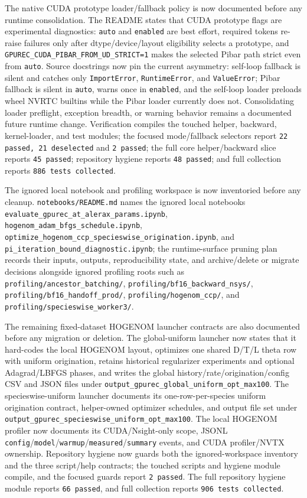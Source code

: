 \documentclass[11pt]{article}
\begin{document}
The native CUDA prototype loader/fallback policy is now documented before any
runtime consolidation.  The README states that CUDA prototype flags are
experimental diagnostics: \texttt{auto} and \texttt{enabled} are best effort,
required tokens re-raise failures only after dtype/device/layout eligibility
selects a prototype, and \texttt{GPUREC\_CUDA\_PIBAR\_FROM\_UD\_STRICT=1}
makes the selected Pibar path strict even from \texttt{auto}.  Source docstrings
now pin the current asymmetry: self-loop fallback is silent and catches only
\texttt{ImportError}, \texttt{RuntimeError}, and \texttt{ValueError};
Pibar fallback is silent in \texttt{auto}, warns once in \texttt{enabled}, and
the self-loop loader preloads wheel NVRTC builtins while the Pibar loader
currently does not.  Consolidating loader preflight, exception breadth, or
warning behavior remains a documented future runtime change.  Verification
compiles the touched helper, backward, kernel-loader, and test modules; the
focused mode/fallback selectors report \texttt{22 passed, 21 deselected} and
\texttt{2 passed}; the full core helper/backward slice reports
\texttt{45 passed}; repository hygiene reports \texttt{48 passed}; and full
collection reports \texttt{886 tests collected}.

The ignored local notebook and profiling workspace is now inventoried before any
cleanup.  \texttt{notebooks/README.md} names the ignored local notebooks
\texttt{evaluate\_gpurec\_at\_alerax\_params.ipynb},
\texttt{hogenom\_adam\_bfgs\_schedule.ipynb},
\texttt{optimize\_hogenom\_ccp\_specieswise\_origination.ipynb}, and
\texttt{pi\_iteration\_bound\_diagnostic.ipynb}; the runtime-surface pruning
plan records their inputs, outputs, reproducibility state, and archive/delete or
migrate decisions alongside ignored profiling roots such as
\texttt{profiling/ancestor\_batching/}, \texttt{profiling/bf16\_backward\_nsys/},
\texttt{profiling/bf16\_handoff\_prod/}, \texttt{profiling/hogenom\_ccp/}, and
\texttt{profiling/specieswise\_worker3/}.

The remaining fixed-dataset HOGENOM launcher contracts are also documented
before any migration or deletion.  The global-uniform launcher now states that it
hard-codes the local HOGENOM layout, optimizes one shared D/T/L theta row with
uniform origination, retains historical regularizer experiments and optional
Adagrad/LBFGS phases, and writes the global history/rate/origination/config CSV
and JSON files under \texttt{output\_gpurec\_global\_uniform\_opt\_max100}.  The
specieswise-uniform launcher documents its one-row-per-species uniform
origination contract, helper-owned optimizer schedules, and output file set
under \texttt{output\_gpurec\_specieswise\_uniform\_opt\_max100}.  The local
HOGENOM profiler now documents its CUDA/Nsight-only scope, JSONL
\texttt{config}/\texttt{model}/\texttt{warmup}/\texttt{measured}/\texttt{summary}
events, and CUDA profiler/NVTX ownership.  Repository hygiene now guards both
the ignored-workspace inventory and the three script/help contracts; the touched
scripts and hygiene module compile, and the focused guards report
\texttt{2 passed}.  The full repository hygiene module reports \texttt{66
passed}, and full collection reports \texttt{906 tests collected}.
\end{document}
